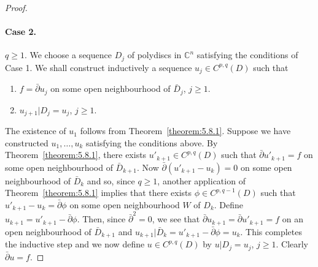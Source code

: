 \begin{proof}
\paragraph{Case 2.} $q\geq1$. We choose a sequence $D_j$ of polydiscs in $\mathbb C^n$ satisfying the conditions of Case 1. We shall construct inductively a sequence $u_j\in C^{p,q}(D)$ such that
\begin{enumerate}
\item $f=\bar\partial u_j$ on some open neighbourhood of $\bar D_j$, $j\geq1$.
\item $u_{j+1}|D_j=u_j$, $j\geq1$.
\end{enumerate}
The existence of $u_1$ follows from Theorem~\ref{theorem:5.8.1}. Suppose we have constructed $u_1,\ldots,u_k$ satisfying the conditions above. By Theorem~\ref{theorem:5.8.1}, there exists $u'_{k+1}\in C^{p,q}(D)$ such that $\bar\partial u'_{k+1}=f$ on some open neighbourhood of $\bar D_{k+1}$. Now $\bar\partial(u'_{k+1}-u_k)=0$ on some open neighbourhood of $\bar D_k$ and so, since $q\geq1$, another application of Theorem~\ref{theorem:5.8.1} implies that there exists $\phi\in C^{p,q-1}(D)$ such that $u'_{k+1}-u_k=\bar\partial\phi$ on some open neighbourhood $W$ of $D_k$. Define $u_{k+1}=u'_{k+1}-\bar\partial\phi$. Then, since $\bar\partial^2=0$, we see that $\bar\partial u_{k+1}=\bar\partial u'_{k+1}=f$ on an open neighbourhood of $\bar D_{k+1}$ and $u_{k+1}|\bar D_k=u'_{k+1}-\bar\partial\phi=u_k$. This completes the inductive step and we now define $u\in C^{p,q}(D)$ by $u|D_j=u_j$, $j\geq1$. Clearly $\bar\partial u=f$.
\end{proof}
